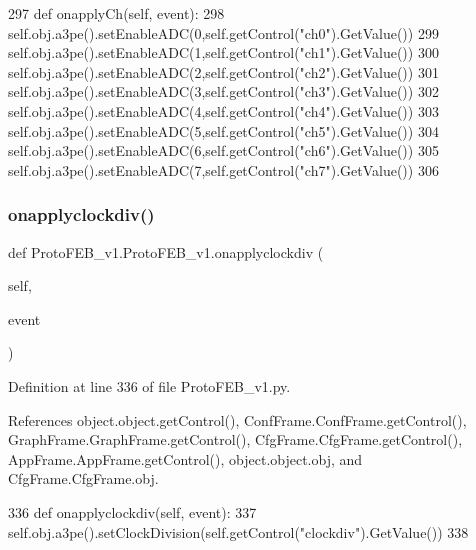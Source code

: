 \begin{DoxyCode}
297     \textcolor{keyword}{def }onapplyCh(self, event):
298         self.obj.a3pe().setEnableADC(0,self.getControl(\textcolor{stringliteral}{"ch0"}).GetValue())
299         self.obj.a3pe().setEnableADC(1,self.getControl(\textcolor{stringliteral}{"ch1"}).GetValue())
300         self.obj.a3pe().setEnableADC(2,self.getControl(\textcolor{stringliteral}{"ch2"}).GetValue())
301         self.obj.a3pe().setEnableADC(3,self.getControl(\textcolor{stringliteral}{"ch3"}).GetValue())
302         self.obj.a3pe().setEnableADC(4,self.getControl(\textcolor{stringliteral}{"ch4"}).GetValue())
303         self.obj.a3pe().setEnableADC(5,self.getControl(\textcolor{stringliteral}{"ch5"}).GetValue())
304         self.obj.a3pe().setEnableADC(6,self.getControl(\textcolor{stringliteral}{"ch6"}).GetValue())
305         self.obj.a3pe().setEnableADC(7,self.getControl(\textcolor{stringliteral}{"ch7"}).GetValue())
306 
\end{DoxyCode}
\mbox{\label{classProtoFEB__v1_1_1ProtoFEB__v1_aa0834fab61762024dcc8c89ba06bd29b}} 
\subsubsection{\texorpdfstring{onapplyclockdiv()}{onapplyclockdiv()}}
{\footnotesize\ttfamily def Proto\+F\+E\+B\+\_\+v1.\+Proto\+F\+E\+B\+\_\+v1.\+onapplyclockdiv (\begin{DoxyParamCaption}\item[{}]{self,  }\item[{}]{event }\end{DoxyParamCaption})}



Definition at line 336 of file Proto\+F\+E\+B\+\_\+v1.\+py.



References object.\+object.\+get\+Control(), Conf\+Frame.\+Conf\+Frame.\+get\+Control(), Graph\+Frame.\+Graph\+Frame.\+get\+Control(), Cfg\+Frame.\+Cfg\+Frame.\+get\+Control(), App\+Frame.\+App\+Frame.\+get\+Control(), object.\+object.\+obj, and Cfg\+Frame.\+Cfg\+Frame.\+obj.


\begin{DoxyCode}
336     \textcolor{keyword}{def }onapplyclockdiv(self, event):
337         self.obj.a3pe().setClockDivision(self.getControl(\textcolor{stringliteral}{"clockdiv"}).GetValue())
338 
\end{DoxyCode}
\mbox{\label{classProtoFEB__v1_1_1ProtoFEB__v1_a2d83c6aa70f086f76cd03957971c35a9}} 
